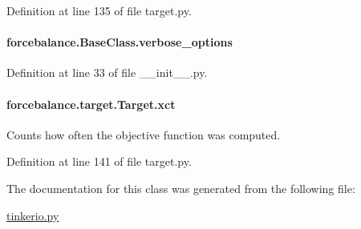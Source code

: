 Definition at line 135 of file target.\-py.

\hypertarget{classforcebalance_1_1BaseClass_afd68efa29ccd2f320f4cf82198214aac}{
\paragraph[{verbose\-\_\-options}]{\setlength{\rightskip}{0pt plus 5cm}forcebalance.\-Base\-Class.\-verbose\-\_\-options\hspace{0.3cm}{\ttfamily [inherited]}}}\label{classforcebalance_1_1BaseClass_afd68efa29ccd2f320f4cf82198214aac}


Definition at line 33 of file \-\_\-\-\_\-init\-\_\-\-\_\-.\-py.

\hypertarget{classforcebalance_1_1target_1_1Target_aad2e385cfbf7b4a68f1c2cb41133fe82}{
\paragraph[{xct}]{\setlength{\rightskip}{0pt plus 5cm}forcebalance.\-target.\-Target.\-xct\hspace{0.3cm}{\ttfamily [inherited]}}}\label{classforcebalance_1_1target_1_1Target_aad2e385cfbf7b4a68f1c2cb41133fe82}


Counts how often the objective function was computed. 



Definition at line 141 of file target.\-py.



The documentation for this class was generated from the following file\-:\begin{DoxyCompactItemize}
\item 
\hyperlink{tinkerio_8py}{tinkerio.\-py}\end{DoxyCompactItemize}
